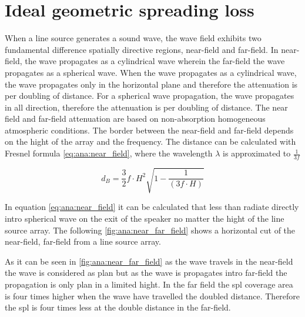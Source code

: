 \section{Ideal geometric spreading loss}\label{sec:ana:geo_spr_los}
When a line source generates a sound wave, the wave field exhibits two fundamental difference spatially directive regions, near-field and far-field. In near-field, the wave propagates as a cylindrical wave wherein the far-field the wave propagates as a spherical wave. When the wave propagates as a cylindrical wave, the wave propagates only in the horizontal plane and therefore the attenuation is  per doubling of distance. For a spherical wave propagation, the wave propagates in all direction, therefore the attenuation is  per doubling of distance. The near field and far-field attenuation are based on non-absorption homogeneous atmospheric conditions. The border between the near-field and far-field depends on the hight of the array and the frequency. The distance can be calculated with Fresnel formula \autoref{eq:ana:near_field}, where the wavelength $\lambda$ is approximated to $\frac{1}{3f}$ \citep{bauman2001wavefront}

\begin{equation}\label{eq:ana:near_field}
d_{B} = \frac{3}{2}f \cdot H^{2}\sqrt{1-\frac{1}{(3f \cdot H)}}
\end{equation}

\startexplain
{}
\stopexplain

In equation \autoref{eq:ana:near_field} it can be calculated that less than  radiate directly intro spherical wave on the exit of the speaker no matter the hight of the line source array. The following \autoref{fig:ana:near_far_field} shows a horizontal cut of the near-field, far-field from a line source array. 


As it can be seen in \autoref{fig:ana:near_far_field} as the wave travels in the near-field the wave is considered as plan but as the wave is propagates intro far-field the propagation is only plan in a limited hight. In the far field the \gls{spl} coverage area is four times higher when the wave have travelled the doubled distance. Therefore the \gls{spl} is four times less at the double distance in the far-field.

